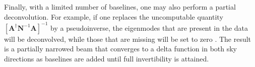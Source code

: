 \documentclass[twocolumn,numberedappendix]{emulateapj}
\newcommand{\A}{\mathbf{A}}
\newcommand{\N}{\mathbf{N}}
\newcommand{\rhat}{\hat{\mathbf{r}}}
\begin{document}
Finally, with a limited number of baselines, one may also perform a partial deconvolution.  For example, if one replaces the uncomputable quantity $\left[ \A^\dagger \N^{-1} \A \right]^{-1}$ by a pseudoinverse, the eigenmodes that are present in the data will be deconvolved, while those that are missing will be set to zero \citep{Shaw2013}.  The result is a partially narrowed beam that converges to a delta function in both sky directions as baselines are added until full invertibility is attained.
%
\end{document}
